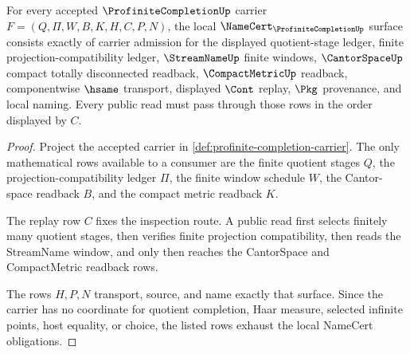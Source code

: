 \begin{theorem}
\label{thm:profinite-completion-namecert-obligations}
For every accepted $\ProfiniteCompletionUp$ carrier $F=(Q,\Pi,W,B,K,H,C,P,N)$, the local $\NameCert_{\ProfiniteCompletionUp}$ surface consists exactly of carrier admission for the displayed quotient-stage ledger, finite projection-compatibility ledger, $\StreamNameUp$ finite windows, $\CantorSpaceUp$ compact totally disconnected readback, $\CompactMetricUp$ readback, componentwise $\hsame$ transport, displayed $\Cont$ replay, $\Pkg$ provenance, and local naming. Every public read must pass through those rows in the order displayed by $C$.
\end{theorem}
\begin{proof}
Project the accepted carrier in \autoref{def:profinite-completion-carrier}. The only mathematical rows available to a consumer are the finite quotient stages $Q$, the projection-compatibility ledger $\Pi$, the finite window schedule $W$, the Cantor-space readback $B$, and the compact metric readback $K$.

The replay row $C$ fixes the inspection route. A public read first selects finitely many quotient stages, then verifies finite projection compatibility, then reads the StreamName window, and only then reaches the CantorSpace and CompactMetric readback rows.

The rows $H,P,N$ transport, source, and name exactly that surface. Since the carrier has no coordinate for quotient completion, Haar measure, selected infinite points, host equality, or choice, the listed rows exhaust the local NameCert obligations.
\end{proof}

